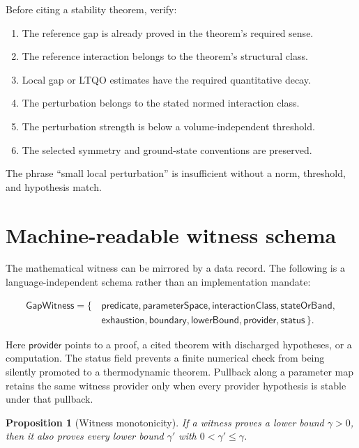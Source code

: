 \documentclass[12pt]{article}
\newtheorem{proposition}[theorem]{Proposition}
\theoremstyle{definition}
\theoremstyle{remark}
\begin{document}
Before citing a stability theorem, verify:

\begin{enumerate}[label=\textbf{P\arabic*.}]
  \item The reference gap is already proved in the theorem's required sense.
  \item The reference interaction belongs to the theorem's structural class.
  \item Local gap or LTQO estimates have the required quantitative decay.
  \item The perturbation belongs to the stated normed interaction class.
  \item The perturbation strength is below a volume-independent threshold.
  \item The selected symmetry and ground-state conventions are preserved.
\end{enumerate}

The phrase ``small local perturbation'' is insufficient without a norm,
threshold, and hypothesis match.

\section{Machine-readable witness schema}

The mathematical witness can be mirrored by a data record. The following is a
language-independent schema rather than an implementation mandate:

\begin{align*}
\mathsf{GapWitness}=\{\,&
\mathsf{predicate},
\mathsf{parameterSpace},
\mathsf{interactionClass},
\mathsf{stateOrBand},\\
&\mathsf{exhaustion},
\mathsf{boundary},
\mathsf{lowerBound},
\mathsf{provider},
\mathsf{status}\,\}.
\end{align*}

Here $\mathsf{provider}$ points to a proof, a cited theorem with discharged
hypotheses, or a computation. The status field prevents a finite numerical
check from being silently promoted to a thermodynamic theorem. Pullback along
a parameter map retains the same witness provider only when every provider
hypothesis is stable under that pullback.

\begin{proposition}[Witness monotonicity]
If a witness proves a lower bound $\gamma>0$, then it also proves every lower
bound $\gamma'$ with $0<\gamma'\leq\gamma$.
\end{proposition}
\end{document}
